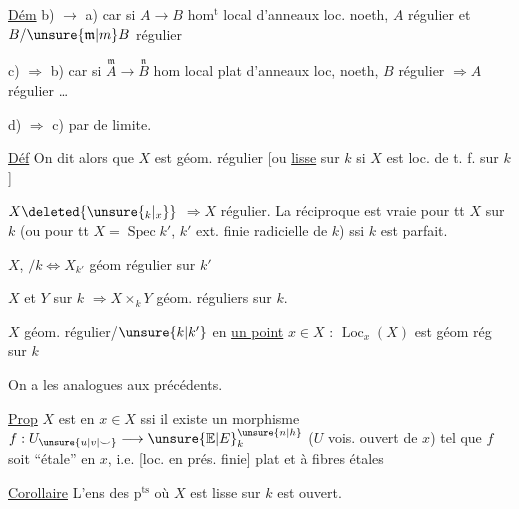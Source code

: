 \uline{Dém} b) $\to$ a) car si $A\to B$ hom$^{\mathrm t}$ local  d'anneaux loc. noeth, $A$ régulier et $B/\unsure{\mathfrak m|m}B$ régulier 

c) $\Rightarrow$ b) car si $\overset{\mathfrak m}{A}\to\overset{\mathfrak n}{B}$ hom local plat d'anneaux loc, noeth,  $B$ régulier $\Rightarrow A$ régulier \ldots

d) $\Rightarrow$ c) par  de limite.

\uline{Déf} On dit alors que $X$ est géom. régulier [ou \uline{lisse} sur $k$ si $X$ est loc. de t. f. sur $k$]

$X\deleted{\unsure{{}_k|{}_x}}$  $\Longrightarrow X$ régulier. La réciproque est vraie pour tt $X$ sur $k$ (ou  pour tt $X=\operatorname{Spec}k'$, $k'$ ext. finie radicielle de $k$) ssi $k$ est parfait.

$X$,  $/k\Longleftrightarrow X_{k'}$ géom régulier sur $k'$

$X$ et $Y$  sur $k$ $\Longrightarrow X\times_kY$ géom. réguliers sur $k$.

$X$  géom. régulier/$\unsure{k|k'}$ en \uline{un point} $x\in X$ : $\operatorname{Loc}_x(X)$ est géom rég sur $k$ 

On a les  analogues aux précédents.


\uline{Prop} $X$  est  en $x\in X$ ssi il existe un  morphisme $f:U_{\unsure{u|v|\smile}}\longrightarrow{\unsure{\mathbb E|E}}^{\unsure{n|h}}_k$ ($U$ vois. ouvert de $x$) tel que $f$ soit ``étale'' en $x$, i.e. [loc. en prés. finie] plat et à fibres étales

\uline{Corollaire} L'ens des p$^{\mathrm{ts}}$ où $X$ est  lisse sur $k$ est ouvert.

